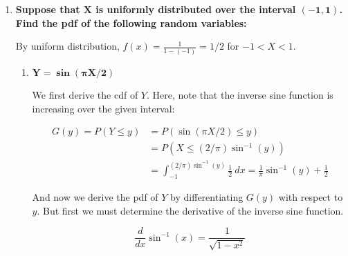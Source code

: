 \documentclass[10pt, oneside]{article}
\begin{document}
\begin{enumerate}[label=5.\arabic*]
\begin{enumerate}
	Then we derive $g(z)$ as follows:
	
	\[ G'(z) = g(z) = \boxed{1 / z^2} \]
	
	Note that $Z = 1 / (X + 1)$ over $0 < X < 1$ implies $1/2 < Z < 1$. Then $g(z) \geq 0$ over $1/2 < Z < 1$. Moreover, $G(1) - G(1/2) = \boxed{1}$.
	
	Alternatively, we can apply Theorem 5.1 because $Z = 1 / (X + 1)$ is monotonic over $1/2 < Z < 1$. Then $X(z) = 1/z - 1$ and $\frac{dx}{dz} = -1/z^2$, then $\big| \frac{dx}{dz} \big| = 1/z^2$. Therefore $g(z) = 1/z^2$, as expected.
	
	\end{enumerate}

\item  \begin{tcolorbox}[
  colback=Cerulean!5!white,
  colframe=Cerulean!75!black]
\textbf{Suppose that $\bm{X}$ is uniformly distributed over the interval $\bm{(-1,1)}$. Find the pdf of the following random variables:}
\end{tcolorbox}

By uniform distribution, $f(x) = \frac{1}{1 - (-1)} = 1/2$ for $-1 < X < 1$.

	\begin{enumerate}
	\item  \begin{tcolorbox}[
	  colback=Cerulean!5!white,
	  colframe=Cerulean!75!black]
	\textbf{$\bm{Y = \sin (\pi X / 2)}$}
	\end{tcolorbox}
	
	We first derive the cdf of $Y$. Here, note that the inverse sine function is increasing over the given interval:
	
	\begin{align*}
	G(y) = P(Y \leq y) &= P(\sin (\pi X / 2) \leq y) \\
	&= P(X \leq (2 / \pi) \sin^{-1} (y)) \\
	&= \int^{(2 / \pi) \sin^{-1} (y)}_{-1} \frac{1}{2} \ dx = \frac{1}{\pi} \sin^{-1} (y) + \frac{1}{2}
	\end{align*}
	
	And now we derive the pdf of $Y$ by differentiating $G(y)$ with respect to $y$. But first we must determine the derivative of the inverse sine function.
	
	\begin{thm}
	\[ \frac{d}{dx} \sin^{-1} (x) = \frac{1}{\sqrt{1 - x^2}} \]
	\end{thm}
	

\end{enumerate}
\end{enumerate}
\end{document}
